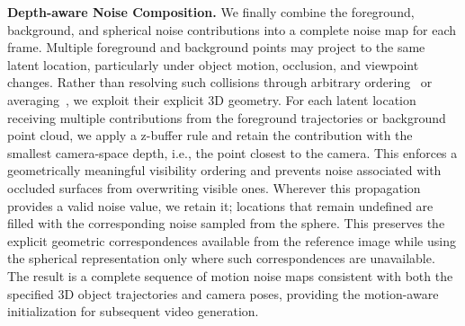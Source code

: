 \ifdefined\arxivbuild\else\documentclass{article}\fi %
\begin{document}
\noindent\textbf{Depth-aware Noise Composition.}
We finally combine the foreground, background, and spherical noise contributions into a complete noise map for each frame. Multiple foreground and background points may project to the same latent location, particularly under object motion, occlusion, and viewpoint changes. Rather than resolving such collisions through arbitrary ordering~\citep{chu2025wan} or averaging~\citep{burgert2025go}, we exploit their explicit 3D geometry. For each latent location receiving multiple contributions from the foreground trajectories or background point cloud, we apply a z-buffer rule and retain the contribution with the smallest camera-space depth, i.e., the point closest to the camera. This enforces a geometrically meaningful visibility ordering and prevents noise associated with occluded surfaces from overwriting visible ones. Wherever this propagation provides a valid noise value, we retain it; locations that remain undefined are filled with the corresponding noise sampled from the sphere. This preserves the explicit geometric correspondences available from the reference image while using the spherical representation only where such correspondences are unavailable. The result is a complete sequence of motion noise maps consistent with both the specified 3D object trajectories and camera poses, providing the motion-aware initialization for subsequent video generation. 




\end{document}
